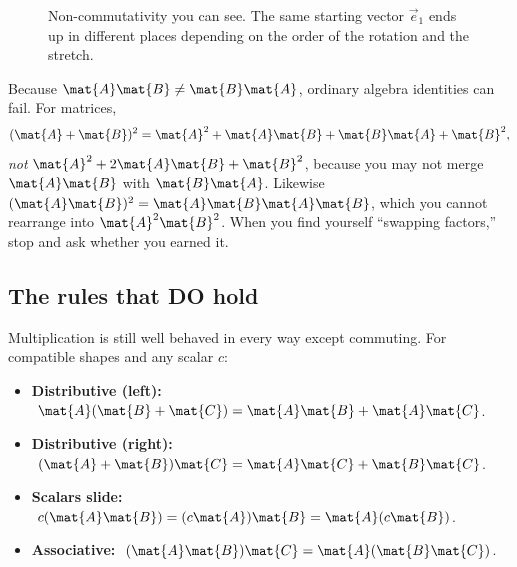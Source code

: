 \begin{figure}[H]
\centering
{}
\caption{Non-commutativity you can see. The same starting vector $\vec{e}_1$ ends up in
different places depending on the order of the rotation and the stretch.}
\label{ch08:noncommute}
\end{figure}

\begin{trapbox}
Because $\mat{A}\mat{B} \ne \mat{B}\mat{A}$, ordinary algebra identities can fail. For
matrices,
\[
(\mat{A}+\mat{B})^2 = \mat{A}^2 + \mat{A}\mat{B} + \mat{B}\mat{A} + \mat{B}^2,
\]
\emph{not} $\mat{A}^2 + 2\mat{A}\mat{B} + \mat{B}^2$, because you may not merge
$\mat{A}\mat{B}$ with $\mat{B}\mat{A}$. Likewise $(\mat{A}\mat{B})^2 = \mat{A}\mat{B}\mat{A}\mat{B}$, which you cannot rearrange into $\mat{A}^2\mat{B}^2$. When you find
yourself ``swapping factors,'' stop and ask whether you earned it.
\end{trapbox}

\subsection{The rules that DO hold}

Multiplication is still well behaved in every way except commuting. For compatible
shapes and any scalar $c$:

\begin{itemize}
\item \textbf{Distributive (left):} $\ \mat{A}(\mat{B}+\mat{C}) = \mat{A}\mat{B} + \mat{A}\mat{C}$.
\item \textbf{Distributive (right):} $\ (\mat{A}+\mat{B})\mat{C} = \mat{A}\mat{C} + \mat{B}\mat{C}$.
\item \textbf{Scalars slide:} $\ c(\mat{A}\mat{B}) = (c\mat{A})\mat{B} = \mat{A}(c\mat{B})$.
\item \textbf{Associative:} $\ (\mat{A}\mat{B})\mat{C} = \mat{A}(\mat{B}\mat{C})$.
\end{itemize}

